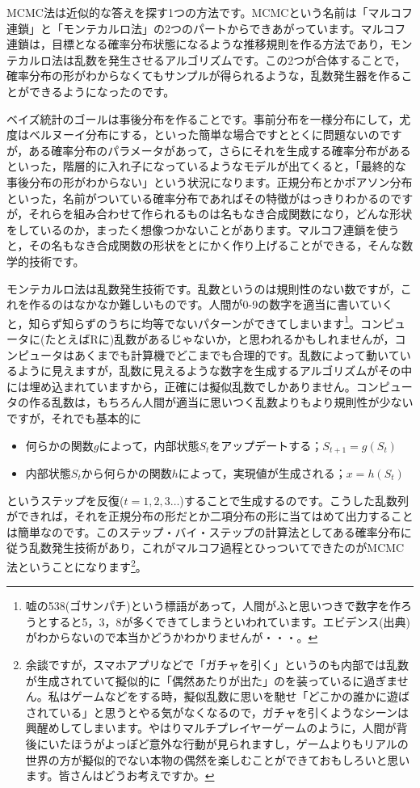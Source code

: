 \documentclass{ltjsbook}
\begin{document}
MCMC法は近似的な答えを探す1つの方法です。MCMCという名前は「マルコフ連鎖」と「モンテカルロ法」の2つのパートからできあがっています。マルコフ連鎖は，目標となる確率分布状態になるような推移規則を作る方法であり，モンテカルロ法は乱数を発生させるアルゴリズムです。この2つが合体することで，確率分布の形がわからなくてもサンプルが得られるような，乱数発生器を作ることができるようになったのです。

ベイズ統計のゴールは事後分布を作ることです。事前分布を一様分布にして，尤度はベルヌーイ分布にする，といった簡単な場合ですととくに問題ないのですが，ある確率分布のパラメータがあって，さらにそれを生成する確率分布があるといった，階層的に入れ子になっているようなモデルが出てくると，「最終的な事後分布の形がわからない」という状況になります。正規分布とかポアソン分布といった，名前がついている確率分布であればその特徴がはっきりわかるのですが，それらを組み合わせて作られるものは名もなき合成関数になり，どんな形状をしているのか，まったく想像つかないことがあります。マルコフ連鎖を使うと，その名もなき合成関数の形状をとにかく作り上げることができる，そんな数学的技術です。

モンテカルロ法は乱数発生技術です。乱数というのは規則性のない数ですが，これを作るのはなかなか難しいものです。人間が0-9の数字を適当に書いていくと，知らず知らずのうちに均等でないパターンができてしまいます\footnote{嘘の538(ゴサンパチ)という標語があって，人間がふと思いつきで数字を作ろうとすると5，3，8が多くできてしまうといわれています。エビデンス(出典)がわからないので本当かどうかわかりませんが・・・。}。コンピュータに(たとえばRに)乱数があるじゃないか，と思われるかもしれませんが，コンピュータはあくまでも計算機でどこまでも合理的です。乱数によって動いているように見えますが，乱数に見えるような数字を生成するアルゴリズムがその中には埋め込まれていますから，正確には擬似乱数でしかありません。コンピュータの作る乱数は，もちろん人間が適当に思いつく乱数よりもより規則性が少ないですが，それでも基本的に
\begin{itemize}
    \item 何らかの関数$g$によって，内部状態$S_t$をアップデートする；$S_{t+1}=g(S_t)$
    \item 内部状態$S_t$から何らかの関数$h$によって，実現値が生成される；$x = h(S_t)$
\end{itemize}
というステップを反復($t=1,2,3\ldots$)することで生成するのです。こうした乱数列ができれば，それを正規分布の形だとか二項分布の形に当てはめて出力することは簡単なのです。このステップ・バイ・ステップの計算法としてある確率分布に従う乱数発生技術があり，これがマルコフ過程とひっついてできたのがMCMC法ということになります\footnote{余談ですが，スマホアプリなどで「ガチャを引く」というのも内部では乱数が生成されていて擬似的に「偶然あたりが出た」のを装っているに過ぎません。私はゲームなどをする時，擬似乱数に思いを馳せ「どこかの誰かに遊ばされている」と思うとやる気がなくなるので，ガチャを引くようなシーンは興醒めしてしまいます。やはりマルチプレイヤーゲームのように，人間が背後にいたほうがよっぽど意外な行動が見られますし，ゲームよりもリアルの世界の方が擬似的でない本物の偶然を楽しむことができておもしろいと思います。皆さんはどうお考えですか。}。
\end{document}
